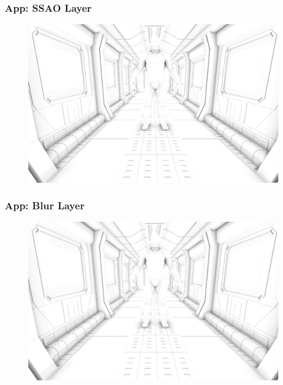 \documentclass{beamer}
\begin{document}
\begin{frame}
\frametitle{App: SSAO Layer}
\begin{figure}
    \centering
    \includegraphics[width=\resultwidth]{images/app_ssao}
\end{figure}

\end{frame}

\begin{frame}
\frametitle{App: Blur Layer}
\begin{figure}
    \centering
    \includegraphics[width=\resultwidth]{images/app_blur}
\end{figure}

\end{frame}
\end{document}
